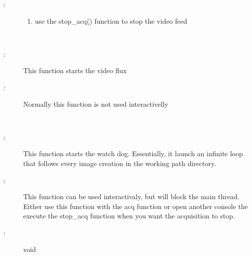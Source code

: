 \documentclass[letterpaper,10pt,english]{sphinxmanual}
\begin{document}
\begin{fulllineitems}
\begin{fulllineitems}
\begin{description}
\item[{:}] \leavevmode\begin{enumerate}
\item {} 
use the stop\_acq() function to stop the video feed

\end{enumerate}

\end{description}

\end{fulllineitems}


\begin{fulllineitems}
\label{\detokenize{index:python_andor.command.video_flux}}~\begin{description}
\item[{:}] \leavevmode
This function starts the video flux

\item[{:}] \leavevmode
Normally this function is not used interactivelly

\end{description}

\end{fulllineitems}


\begin{fulllineitems}
\label{\detokenize{index:python_andor.command.watch_dog}}~\begin{description}
\item[{:}] \leavevmode
This function starts the watch dog. Essentially, it launch an infinite loop that follows every image creation in the working path directory.

\item[{:}] \leavevmode
This function can be used interactivaly, but will block the main thread. Either use this function with the acq function or open another console the execute the stop\_acq function when you want the acquisition to stop.

\item[{:}] \leavevmode
void

\end{description}

\end{fulllineitems}


\end{fulllineitems}
\end{document}

